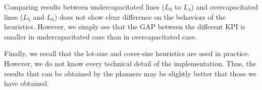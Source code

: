 Comparing results between undercapacitated lines ($L_0$ to $L_4$) and overcapacitated lines ($L_5$ and $L_6$) does not show clear difference on the behaviors of the heuristics.
However, we simply see that the GAP between the different KPI is smaller in undercapacitated case than in overcapacitated case.


Finally, we recall that the lot-size and cover-size heuristics are used in practice.
However, we do not know every technical detail of the implementation.
Thus, the results that can be obtained by the planners may be slightly better that those we have obtained.








